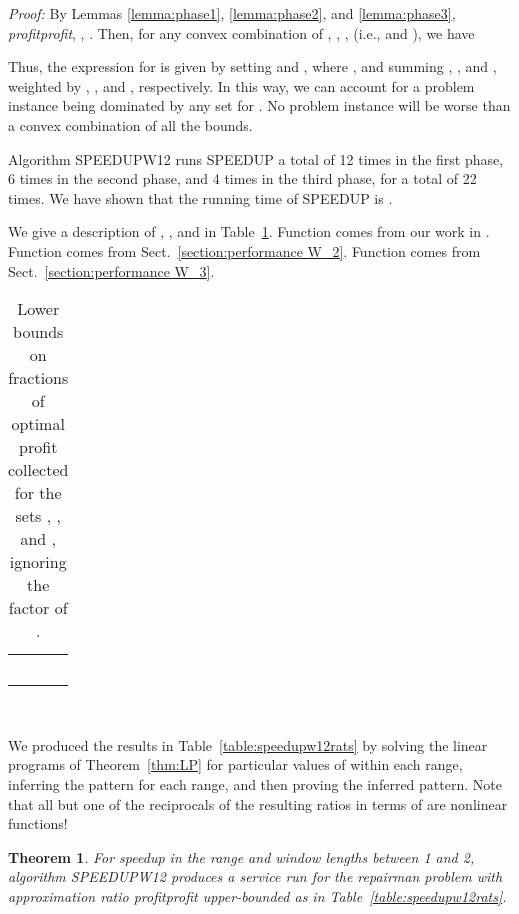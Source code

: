 \documentclass[11pt]{article}
\newtheorem{theorem}{Theorem}[section]
\newcommand\QED{\ifhmode\allowbreak\else\nobreak\fi
\quad\nobreak\medbreak}
\newcommand{\proofstart}{\par\noindent \emph{Proof:} }
\newcommand{\proofend}{\QED\par}
\newenvironment{proof}{\proofstart}{\proofend}
\begin{document}
\begin{proof}
By Lemmas \ref{lemma:phase1}, \ref{lemma:phase2}, and \ref{lemma:phase3}, {\it profit}{\it profit}, , .
Then, for any convex combination of , , , (i.e.,  and ), we have 


Thus, the expression for  is given by setting  and , where , and summing , , and , weighted by , , and , respectively.  In this way, we can account for a problem instance being dominated by any set  for .  No problem instance will be worse than a convex combination of all the bounds.  

Algorithm SPEEDUPW12 runs SPEEDUP a total of 12 times in the first phase, 6 times in the second phase, and 4 times in the third phase, for a total of 22 times.  We have shown that the running time of SPEEDUP is .
\end{proof}

We give a description of , , and  in Table~\ref{table:Wratios}.
Function  comes from our work in \cite{Frederickson5}.  Function  comes from Sect.~\ref{section:performance W_2}.  Function  comes from Sect.~\ref{section:performance W_3}.

\begin{table}[!hbt]
\begin{center}
\begin{tabular}{rll}
 & 
 &

\\ \\
 &
 &

\\ \\
 &
 &

\end{tabular}\\
\caption{Lower bounds on fractions of optimal profit collected for the sets , , and , ignoring the factor of .}
\label{table:Wratios}
\end{center}
\end{table}


We produced the results in Table~\ref{table:speedupw12rats} by solving the linear programs of Theorem~\ref{thm:LP} for particular values of 
within each range, inferring the pattern for each range, and then proving the inferred pattern. 
Note that all but one of the reciprocals of the resulting ratios in terms of  are nonlinear functions!

\begin{theorem}
\label{theorem:1<s<6}
For speedup  in the range 
and window lengths between 1 and 2,
algorithm SPEEDUPW12 produces a service run  for the repairman problem
with approximation ratio profitprofit upper-bounded as in Table~\ref{table:speedupw12rats}.
\end{theorem}
\end{document}
